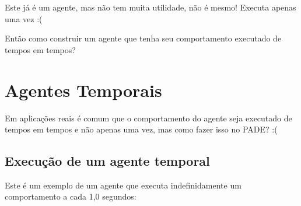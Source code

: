 \documentclass[letterpaper,10pt,brazil]{sphinxmanual}
\begin{document}
Este já é um agente, mas não tem muita utilidade, não é mesmo! Executa apenas uma vez :(

Então como construir um agente que tenha seu comportamento executado de tempos em tempos?


\section{Agentes Temporais}
\label{user/agentes-temporais::doc}\label{user/agentes-temporais:agentes-temporais}
Em aplicações reais é comum que o comportamento do agente seja executado de tempos em tempos e não apenas uma vez, mas como fazer isso no PADE? :(


\subsection{Execução de um agente temporal}
\label{user/agentes-temporais:execucao-de-um-agente-temporal}
Este é um exemplo de um agente que executa indefinidamente um comportamento a cada 1,0 segundos:
\end{document}

